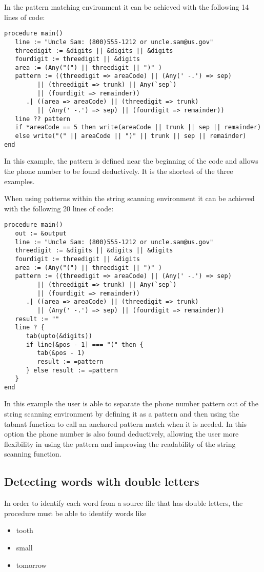 \documentclass{article}
\begin{document}
In the pattern matching environment it can be achieved with the following 14 lines of code:
\begin{verbatim}
procedure main()
   line := "Uncle Sam: (800)555-1212 or uncle.sam@us.gov"
   threedigit := &digits || &digits || &digits
   fourdigit := threedigit || &digits
   area := (Any("(") || threedigit || ")" )
   pattern := ((threedigit => areaCode) || (Any(' -.') => sep) 
         || (threedigit => trunk) || Any(`sep`) 
         || (fourdigit => remainder))
      .| ((area => areaCode) || (threedigit => trunk) 
         || (Any(' -.') => sep) || (fourdigit => remainder))
   line ?? pattern
   if *areaCode == 5 then write(areaCode || trunk || sep || remainder)
   else write("(" || areaCode || ")" || trunk || sep || remainder) 
end
\end{verbatim}
In this example, the pattern is defined near the beginning of the code and allows the phone number to be found deductively.  It is the shortest of the three examples.

When using patterns within the string scanning environment it can be achieved with the following 20 lines of code:
\begin{verbatim}
procedure main()
   out := &output
   line := "Uncle Sam: (800)555-1212 or uncle.sam@us.gov"
   threedigit := &digits || &digits || &digits
   fourdigit := threedigit || &digits
   area := (Any("(") || threedigit || ")" )
   pattern := ((threedigit => areaCode) || (Any(' -.') => sep) 
         || (threedigit => trunk) || Any(`sep`) 
         || (fourdigit => remainder))
      .| ((area => areaCode) || (threedigit => trunk) 
         || (Any(' -.') => sep) || (fourdigit => remainder))
   result := ""
   line ? {
      tab(upto(&digits))
      if line[&pos - 1] === "(" then {
         tab(&pos - 1)
         result := =pattern
      } else result := =pattern
   }
end
\end{verbatim}
In this example the user is able to separate the phone number pattern out of the string scanning environment by defining it as a pattern and then using the tabmat function to call an anchored pattern match when it is needed.  In this option the phone number is also found deductively, allowing the user more flexibility in using the pattern and improving the readability of the string scanning function.

\subsection{Detecting words with double letters}
In order to identify each word from a source file that has double letters, the procedure must be able to identify words like
\begin{itemize}
\item tooth
\item small
\item tomorrow
\end{itemize}
\end{document}
